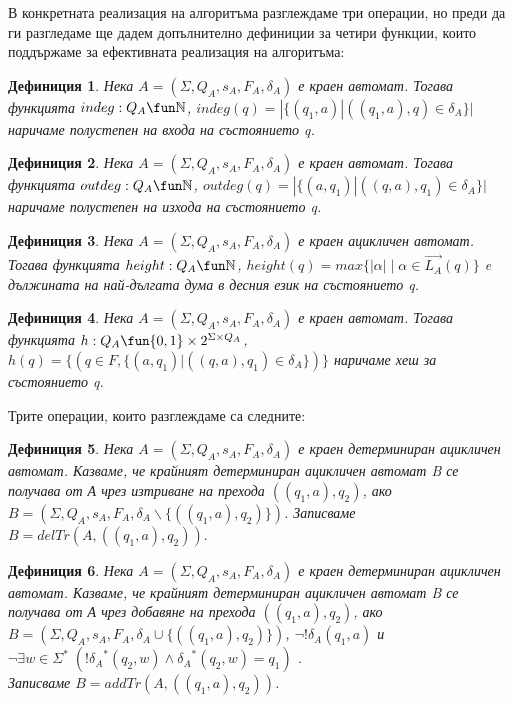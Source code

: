 \documentclass[a4paper,12pt]{article}
\newtheorem{defn}{Дефиниция}[section]
\begin{document}
\bigskip
  В конкретната реализация на алгоритъма разглеждаме три операции, но преди да ги разгледаме ще дадем допълнително дефиниции за
  четири функции, които поддържаме за ефективната реализация на алгоритъма:

\bigskip
\begin{defn} Нека $A = (\Sigma, Q_A, s_A, F_A, \delta_A)$  е краен автомат. Тогава функцията $indeg : Q_A \fun \mathbb N$,
$indeg(q) = |\{(q_1, a) | ((q_1, a), q) \in \delta_A \}|$ наричаме полустепен на входа на състоянието q.
\end{defn}
\begin{defn} Нека $A = (\Sigma, Q_A, s_A, F_A, \delta_A)$  е краен автомат. Тогава функцията $outdeg : Q_A \fun \mathbb N$,
$outdeg(q) = |\{(a, q_1) | ((q, a), q_1) \in \delta_A \}|$ наричаме полустепен на изхода на състоянието q.
\end{defn}
\begin{defn} Нека $A = (\Sigma, Q_A, s_A, F_A, \delta_A)$  е краен ацикличен автомат. Тогава функцията  $height : Q_A \fun \mathbb N$,
$height(q) = max \{ |\alpha|\;|\;\alpha \in \vec{L_A}(q) \}$ e дължината на най-дългата дума в десния език на състоянието q.
\end{defn}
\begin{defn} Нека $A = (\Sigma, Q_A, s_A, F_A, \delta_A)$  е краен автомат. Тогава функцията $h : Q_A \fun \{0,1\} \times 2 ^{ \Sigma \times Q_A}$,
$h(q) = \{ (q \in F, \{(a, q_1) | ((q, a), q_1) \in \delta_A\}) \}$ наричаме хеш за състоянието q.
\end{defn}

\bigskip
 Трите операции, които разглеждаме са следните:

\begin{defn}\label{def2}
Нека $A = (\Sigma, Q_A, s_A, F_A, \delta_A)$  е краен детерминиран ацикличен автомат. Казваме, че крайният детерминиран ацикличен автомат B се получава от А
чрез изтриване на прехода $((q_1, a), q_2)$, ако $B = (\Sigma, Q_A, s_A, F_A, \delta_A \backslash \{((q_1, a), q_2)\})$. Записваме $B = delTr(A, ((q_1, a), q_2)). $ \\
\end{defn}

\begin{defn}\label{def3}
Нека $A = (\Sigma, Q_A, s_A, F_A, \delta_A)$  е краен детерминиран ацикличен автомат. Казваме, че крайният детерминиран ацикличен автомат B се получава от А
чрез добавяне на прехода $((q_1, a), q_2)$, ако $B = (\Sigma, Q_A, s_A, F_A, \delta_A \cup \{((q_1, a), q_2)\})$, $\neg !\delta_A(q_1, a)$ и
$\neg \exists w \in \Sigma^*\;(!{\delta_A}^*(q_2, w) \land {\delta_A}^*(q_2, w) = q_1)$ .\\ Записваме $B = addTr(A, ((q_1, a), q_2))$.
\end{defn}
\end{document}
